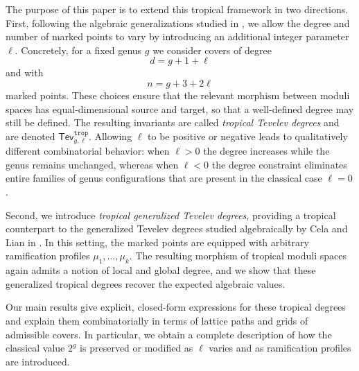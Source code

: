 \documentclass[11pt,reqno]{amsart}
\theoremstyle{definition}
\newcommand\trop{{\mathtt{trop}}}
\newcommand{\Tev}{{\mathsf{Tev}}}
\begin{document}
The purpose of this paper is to extend this tropical framework in two directions. First, following the algebraic generalizations studied in \cite{CPS:Tevdeg}, we allow the degree and number of marked points to vary by introducing an additional integer parameter $\ell$. Concretely, for a fixed genus $g$ we consider covers of degree 
\[d=g+1+\ell\] and with \[n=g+3+2\ell\] marked points. These choices ensure that the relevant morphism between moduli spaces has equal-dimensional source and target, so that a well-defined degree may still be defined. The resulting invariants are called \textit{tropical Tevelev degrees} and are denoted $\Tev_{g,\ell}^\trop$. Allowing $\ell$ to be positive or negative leads to qualitatively different combinatorial behavior: when $\ell>0$ the degree increases while the genus remains unchanged, whereas when $\ell<0$ the degree constraint eliminates entire families of genus configurations that are present in the classical case $\ell=0$.

Second, we introduce \textit{tropical generalized Tevelev degrees}, providing a tropical counterpart to the generalized Tevelev degrees studied algebraically by Cela and Lian in \cite{GenTev}. In this setting, the marked points are equipped with arbitrary ramification profiles $\mu_1,\dots,\mu_k$. The resulting morphism of tropical moduli spaces again admits a notion of local and global degree, and we show that these generalized tropical degrees recover the expected algebraic values.

Our main results give explicit, closed-form expressions for these tropical degrees and explain them combinatorially in terms of lattice paths and grids of admissible covers. In particular, we obtain a complete description of how the classical value $2^g$ is preserved or modified as $\ell$ varies and as ramification profiles are introduced.
\end{document}
